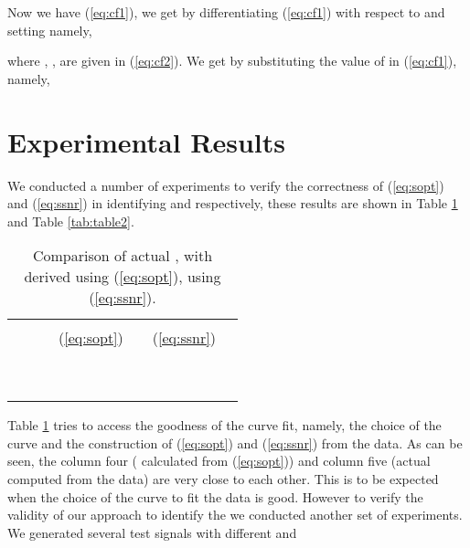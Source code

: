 \documentclass[journal,onecolumn]{IEEEtran}
\begin{document}
 Now we have (\ref{eq:cf1}), we get  by 
differentiating (\ref{eq:cf1}) with
respect to
 and setting 
namely, 

where , ,  are given in (\ref{eq:cf2}). We get
 by substituting the value of  in
(\ref{eq:cf1}), namely,


\section{Experimental Results}
\label{sec:experimental_results}

We conducted a number of experiments to verify the correctness of
(\ref{eq:sopt}) and (\ref{eq:ssnr}) in identifying  and
 respectively, these results are shown 
in Table \ref{tab:table1} and Table \ref{tab:table2}.
\begin{table}
\begin{center}
\begin{tabular}{|c|c|c|c|c|c|c|}
\hline \hline
 &  &  &   &  & 
 &  \\
&  &  & (\ref{eq:sopt}) &  & (\ref{eq:ssnr})&  \\
\hline \hline
 &  &  &  &  &  &  \\ \hline
 &  &  &  &  &  &  \\ \hline
 &  &  &  &  &  &  \\ \hline \hline
 &  &  &  &  &  &  \\ \hline
 &  &  &  &  &  &  \\ \hline
 &  &  &  &  &  &  \\ \hline \hline
 &  &  &  &  &  &  \\ \hline
 &  &  &  &  &  &  \\ \hline
 &  &  &  &  &  &  \\ \hline
\end{tabular}
\caption{Comparison of actual ,  with derived
 using (\ref{eq:sopt}),  using (\ref{eq:ssnr}).}
\label{tab:table1}
\end{center}
\end{table}
Table \ref{tab:table1} tries to access the goodness of the curve fit, namely,
the choice of the curve and the construction of (\ref{eq:sopt}) 
and (\ref{eq:ssnr}) from the data. 
As can be seen, the column four ( calculated from
(\ref{eq:sopt})) and column five (actual
 computed from the data) are very close to each other. This is
to be expected when the choice of the curve to fit the data is good. 
However to verify the validity of our approach to identify the 
we conducted another set of experiments. We generated several 
test
signals with different  and
\end{document}
